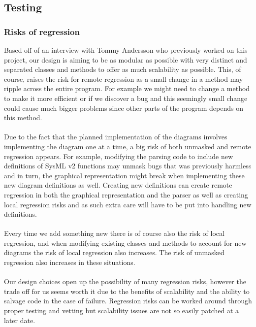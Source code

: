 \documentclass{article}
\begin{document}
\subsection{Testing}


\subsubsection{Risks of regression}

Based off of an interview with Tommy Andersson who previously worked on this project, our design is aiming to be as modular as possible with very distinct and separated classes and methods to offer as much scalability as possible. This, of course, raises the risk for remote regression as a small change in a method may ripple across the entire program. For example we might need to change a method to make it more efficient or if we discover a bug and this seemingly small change could cause much bigger problems since other parts of the program depends on this method. 
\\\\
Due to the fact that the planned implementation of the diagrams involves implementing the diagram one at a time, a big risk of both unmasked and remote regression appears. For example, modifying the parsing code  to include new definitions of SysML v2 functions may unmask bugs that was previously harmless and in turn, the graphical representation might break when implementing these new diagram definitions as well. Creating new definitions can create remote regression in both the graphical representation and the parser as well as creating local regression risks and as such extra care will have to be put into handling new definitions.
\\\\
Every time we add something new there is of course also the risk of local regression, and when modifying existing classes and methods to account for new diagrams the risk of local regression also increases. The risk of unmasked regression also increases in these situations.
\\\\
Our design choices open up the possibility of many regression risks, however the trade off for us seems worth it due to the benefits of scalability and the ability to salvage code in the case of failure. Regression risks can be worked around through proper testing and vetting but scalability issues are not so easily patched at a later date.
\end{document}
